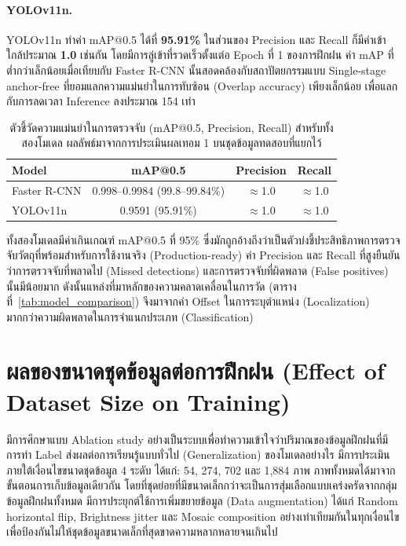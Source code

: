 \paragraph{YOLOv11n.}
YOLOv11n ทำค่า mAP@0.5 ได้ที่ \textbf{95.91\%}
ในส่วนของ Precision และ Recall ก็มีค่าเข้าใกล้ประมาณ \textbf{1.0} เช่นกัน โดยมีการลู่เข้าที่รวดเร็วตั้งแต่อ Epoch ที่ 1 ของการฝึกฝน
ค่า mAP ที่ต่ำกว่าเล็กน้อยเมื่อเทียบกับ Faster R-CNN นั้นสอดคล้องกับสถาปัตยกรรมแบบ Single-stage anchor-free ที่ยอมแลกความแม่นยำในการทับซ้อน (Overlap accuracy) เพียงเล็กน้อย เพื่อแลกกับการลดเวลา Inference ลงประมาณ 154 เท่า

\begin{table}[H]
  \centering
  \caption{ตัวชี้วัดความแม่นยำในการตรวจจับ (mAP@0.5, Precision, Recall) สำหรับทั้งสองโมเดล
           ผลลัพธ์มาจากการประเมินผลเทอม 1 บนชุดข้อมูลทดสอบที่แยกไว้}
  \label{tab:map_metrics}
  \begin{tabular}{lccc}
    \toprule
    \textbf{Model} & \textbf{mAP@0.5} & \textbf{Precision} & \textbf{Recall} \\
    \midrule
    Faster R-CNN & 0.998--0.9984 (99.8--99.84\%) & $\approx$1.0 & $\approx$1.0 \\
    YOLOv11n     & 0.9591 (95.91\%)               & $\approx$1.0 & $\approx$1.0 \\
    \bottomrule
  \end{tabular}
\end{table}

ทั้งสองโมเดลมีค่าเกินเกณฑ์ mAP@0.5 ที่ 95\% ซึ่งมักถูกอ้างถึงว่าเป็นตัวบ่งชี้ประสิทธิภาพการตรวจจับวัตถุที่พร้อมสำหรับการใช้งานจริง (Production-ready) \cite{ren2015faster}
ค่า Precision และ Recall ที่สูงยืนยันว่าการตรวจจับที่พลาดไป (Missed detections) และการตรวจจับที่ผิดพลาด (False positives) นั้นมีน้อยมาก ดังนั้นแหล่งที่มาหลักของความคลาดเคลื่อนในการวัด (ตารางที่~\ref{tab:model_comparison}) จึงมาจากค่า Offset ในการระบุตำแหน่ง (Localization) มากกว่าความผิดพลาดในการจำแนกประเภท (Classification)

\section{ผลของขนาดชุดข้อมูลต่อการฝึกฝน (Effect of Dataset Size on Training)}
\label{sec:dataset_size}

มีการศึกษาแบบ Ablation study อย่างเป็นระบบเพื่อทำความเข้าใจว่าปริมาณของข้อมูลฝึกฝนที่มีการทำ Label ส่งผลต่อการเรียนรู้แบบทั่วไป (Generalization) ของโมเดลอย่างไร
มีการประเมินภายใต้เงื่อนไขขนาดชุดข้อมูล 4 ระดับ ได้แก่: 54, 274, 702 และ 1,884 ภาพ
ภาพทั้งหมดได้มาจากขั้นตอนการเก็บข้อมูลเดียวกัน โดยที่ชุดย่อยที่มีขนาดเล็กกว่าจะเป็นการสุ่มเลือกแบบเคร่งครัดจากกลุ่มข้อมูลฝึกฝนทั้งหมด
มีการประยุกต์ใช้การเพิ่มขยายข้อมูล (Data augmentation) ได้แก่ Random horizontal flip, Brightness jitter และ Mosaic composition อย่างเท่าเทียมกันในทุกเงื่อนไข เพื่อป้องกันไม่ให้ชุดข้อมูลขนาดเล็กที่สุดขาดความหลากหลายจนเกินไป

